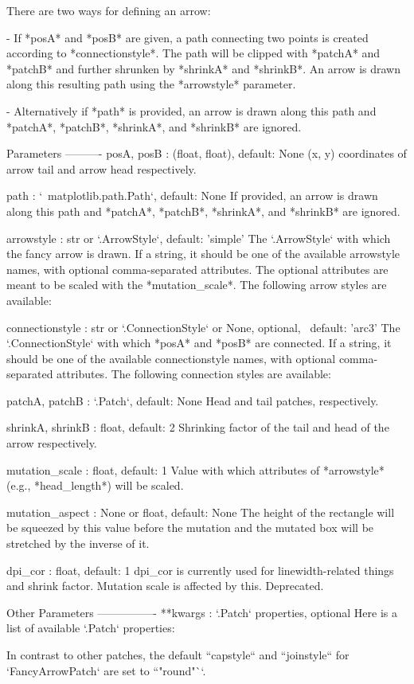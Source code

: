 \begin{DoxyVerb}There are two ways for defining an arrow:

- If *posA* and *posB* are given, a path connecting two points is
  created according to *connectionstyle*. The path will be
  clipped with *patchA* and *patchB* and further shrunken by
  *shrinkA* and *shrinkB*. An arrow is drawn along this
  resulting path using the *arrowstyle* parameter.

- Alternatively if *path* is provided, an arrow is drawn along this
  path and *patchA*, *patchB*, *shrinkA*, and *shrinkB* are ignored.

Parameters
----------
posA, posB : (float, float), default: None
    (x, y) coordinates of arrow tail and arrow head respectively.

path : `~matplotlib.path.Path`, default: None
    If provided, an arrow is drawn along this path and *patchA*,
    *patchB*, *shrinkA*, and *shrinkB* are ignored.

arrowstyle : str or `.ArrowStyle`, default: 'simple'
    The `.ArrowStyle` with which the fancy arrow is drawn.  If a
    string, it should be one of the available arrowstyle names, with
    optional comma-separated attributes.  The optional attributes are
    meant to be scaled with the *mutation_scale*.  The following arrow
    styles are available:


connectionstyle : str or `.ConnectionStyle` or None, optional, \
default: 'arc3'
    The `.ConnectionStyle` with which *posA* and *posB* are connected.
    If a string, it should be one of the available connectionstyle
    names, with optional comma-separated attributes.  The following
    connection styles are available:


patchA, patchB : `.Patch`, default: None
    Head and tail patches, respectively.

shrinkA, shrinkB : float, default: 2
    Shrinking factor of the tail and head of the arrow respectively.

mutation_scale : float, default: 1
    Value with which attributes of *arrowstyle* (e.g., *head_length*)
    will be scaled.

mutation_aspect : None or float, default: None
    The height of the rectangle will be squeezed by this value before
    the mutation and the mutated box will be stretched by the inverse
    of it.

dpi_cor : float, default: 1
    dpi_cor is currently used for linewidth-related things and shrink
    factor. Mutation scale is affected by this.  Deprecated.

Other Parameters
----------------
**kwargs : `.Patch` properties, optional
    Here is a list of available `.Patch` properties:


    In contrast to other patches, the default ``capstyle`` and
    ``joinstyle`` for `FancyArrowPatch` are set to ``"round"``.
\end{DoxyVerb}
 

